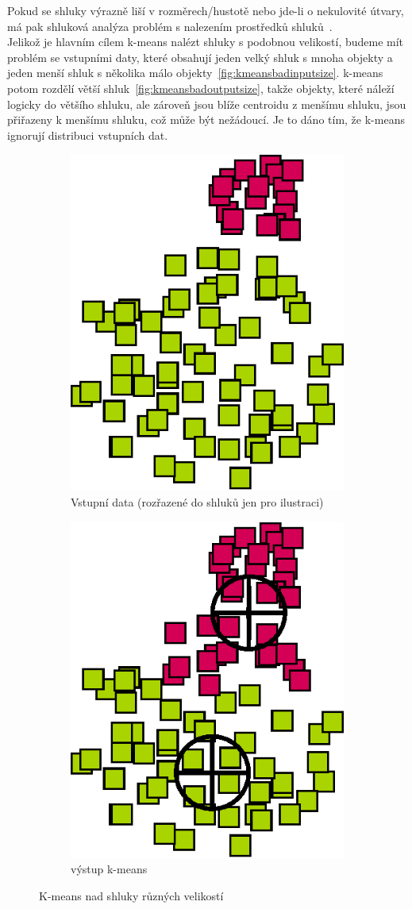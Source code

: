 Pokud se shluky výrazně liší v rozměrech/hustotě nebo jde-li o nekulovité útvary, má pak shluková analýza problém s nalezením prostředků shluků~\cite{Tan05}. \\
Jelikož je hlavním cílem k-means nalézt shluky s podobnou velikostí, budeme mít problém se vstupními daty, které obsahují jeden velký shluk s mnoha objekty a jeden menší shluk s několika málo objekty~\autoref{fig:kmeansbadinputsize}. k-means potom rozdělí větší shluk~\autoref{fig:kmeansbadoutputsize}, takže objekty, které náleží logicky do většího shluku, ale zároveň jsou blíže centroidu z menšímu shluku, jsou přiřazeny k menšímu shluku, což může být nežádoucí. Je to dáno tím, že k-means ignorují distribuci vstupních dat.

\begin{figure}[h]
\centering
\begin{subfigure}{.49\textwidth}
  \centering
  \includegraphics[width=.5\linewidth]{img/kmeans_badInputSampleSize.eps}
  \caption{Vstupní data (rozřazené do shluků jen pro ilustraci)}
  \label{fig:kmeansbadinputsize}
\end{subfigure}
\begin{subfigure}{.49\textwidth}
  \centering
  \includegraphics[width=.5\linewidth]{img/kmeans_badOutputSampleSize.eps}
  \caption{výstup k-means}
  \label{fig:kmeansbadoutputsize}
\end{subfigure}
\caption{K-means nad shluky různých velikostí}
\end{figure}

